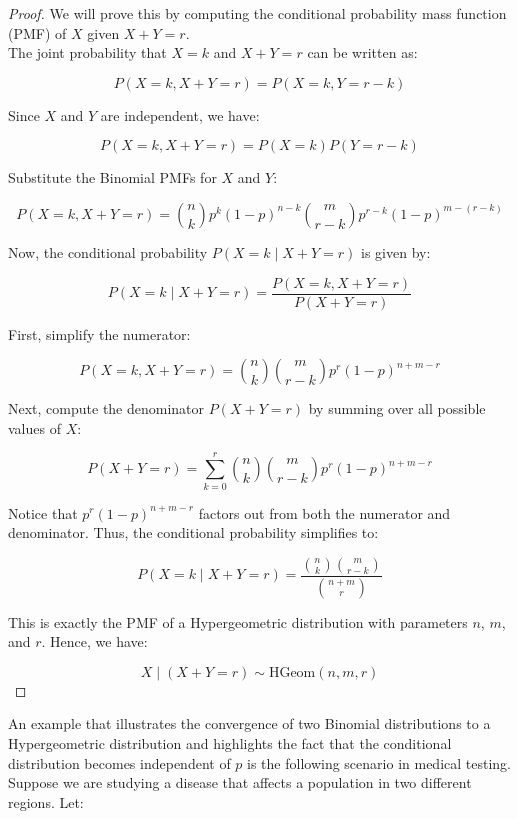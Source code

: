\begin{proof}

We will prove this by computing the conditional probability mass function (PMF) of \( X \) given \( X + Y = r \). \\

The joint probability that \( X = k \) and \( X + Y = r \) can be written as:

\[
P(X = k, X + Y = r) = P(X = k, Y = r - k)
\]

Since \( X \) and \( Y \) are independent, we have:

\[
P(X = k, X + Y = r) = P(X = k) P(Y = r - k)
\]

Substitute the Binomial PMFs for \( X \) and \( Y \):

\[
P(X = k, X + Y = r) = \binom{n}{k} p^k (1-p)^{n-k} \binom{m}{r-k} p^{r-k} (1-p)^{m-(r-k)}
\]

Now, the conditional probability \( P(X = k \mid X + Y = r) \) is given by:

\[
P(X = k \mid X + Y = r) = \frac{P(X = k, X + Y = r)}{P(X + Y = r)}
\]

First, simplify the numerator:

\[
P(X = k, X + Y = r) = \binom{n}{k} \binom{m}{r-k} p^r (1-p)^{n+m-r}
\]

Next, compute the denominator \( P(X + Y = r) \) by summing over all possible values of \( X \):

\[
P(X + Y = r) = \sum_{k=0}^{r} \binom{n}{k} \binom{m}{r-k} p^r (1-p)^{n+m-r}
\]

Notice that \( p^r (1-p)^{n+m-r} \) factors out from both the numerator and denominator. Thus, the conditional probability simplifies to:

\[
P(X = k \mid X + Y = r) = \frac{\binom{n}{k} \binom{m}{r-k}}{\binom{n+m}{r}}
\]

This is exactly the PMF of a Hypergeometric distribution with parameters \( n \), \( m \), and \( r \). Hence, we have:

\[
X \mid (X + Y = r) \sim \text{HGeom}(n, m, r)
\]
    
\end{proof}

An example that illustrates the convergence of two Binomial distributions to a Hypergeometric distribution and highlights the fact that the conditional distribution becomes independent of \(p\) is the following scenario in medical testing. Suppose we are studying a disease that affects a population in two different regions. Let:

